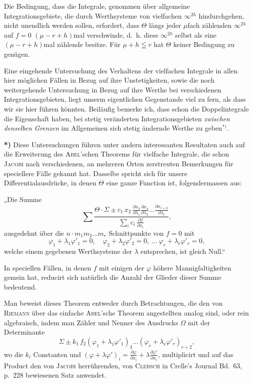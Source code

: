 \documentclass{article}
\begin{document}
Die Bedingung, dass die Integrale, genommen über allgemeine Integrationsgebiete, die durch Werthsysteme von vielfachen $\infty^{2h}$ hindurchgehen, nicht unendlich werden sollen, erfordert, dass $\Theta$ längs jeder $\mu$fach zählenden $\infty^{2h}$ auf $f = 0$ $(\mu - r + h)$mal verschwinde, d.~h. diese $\infty^{2h}$ selbst als eine $(\mu - r + h)$mal zählende besitze. Für $\mu + h \leqq r$ hat $\Theta$ keiner Bedingung zu genügen.

Eine eingehende Untersuchung des Verhaltens der vielfachen Integrale in allen hier möglichen Fällen in Bezug auf ihre Unstetigkeiten, sowie die noch weitergehende Untersuchung in Bezug auf ihre Werthe bei verschiedenen Integrationsgebieten, liegt unserm eigentlichen Gegenstande viel zu fern, als dass wir sie hier führen könnten. Beiläufig bemerke ich, dass schon die Doppelintegrale die Eigenschaft haben, bei stetig veränderten Integrationsgebieten \emph{zwischen denselben Grenzen} im Allgemeinen sich stetig ändernde Werthe zu geben${}^{*)}$.

\textbf{*)} Diese Untersuchungen führen unter andern interessanten Resultaten auch auf die Erweiterung des \textsc{Abel}'schen Theorems für vielfache Integrale, die schon \textsc{Jacobi} nach verschiedenen, an mehreren Orten zerstreuten Bemerkungen für speciellere Fälle gekannt hat. Dasselbe spricht sich für unsere Differentialausdrücke, in denen $\Theta$ eine ganze Function ist, folgendermassen aus:

„Die Summe
\[
\sum \frac{\Theta \cdot \Sigma \pm c_1\, x_2\, \frac{\partial x_3}{\partial \lambda_1} \frac{\partial x_4}{\partial \lambda_2} \dots \frac{\partial x_{r+2}}{\partial \lambda_r}}{\displaystyle\sum_i c_i\, \frac{\partial f}{\partial x_i}},
\]
ausgedehnt über die $n \cdot m_1 m_2 \dots m_r$ Schnittpunkte von $f = 0$ mit
\[
\varphi_1 + \lambda_1 \varphi'_1 = 0, \quad \varphi_2 + \lambda_2 \varphi'_2 = 0, \ \dots\ \varphi_r + \lambda_r \varphi'_r = 0,
\]
welche einem gegebenen Werthsysteme der $\lambda$ entsprechen, ist gleich Null.“

In speciellen Fällen, in denen $f$ mit einigen der $\varphi$ höhere Mannigfaltigkeiten gemein hat, reducirt sich natürlich die Anzahl der Glieder dieser Summe bedeutend.

Man beweist dieses Theorem entweder durch Betrachtungen, die den von \textsc{Riemann} über das einfache \textsc{Abel}'sche Theorem angestellten analog sind, oder rein algebraisch, indem man Zähler und Nenner des Ausdrucks $\Omega$ mit der Determinante
\[
\Sigma \pm k_1\, f_2 (\varphi_1 + \lambda_1 \varphi'_1)_3 \dots (\varphi_r + \lambda_r \varphi'_r)_{r+2},
\]
wo die $k_i$ Constanten und $(\varphi + \lambda \varphi')_i = \frac{\partial \varphi}{\partial x_i} + \lambda \frac{\partial \varphi'}{\partial x_i}$, multiplicirt und auf das Product den von \textsc{Jacobi} herrührenden, von \textsc{Clebsch} in Crelle's Journal Bd.~63, p.~228 bewiesenen Satz anwendet.
\end{document}
